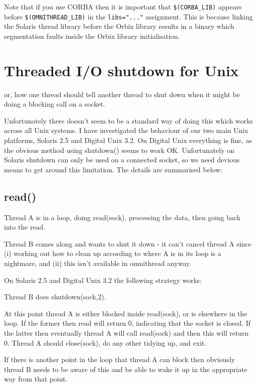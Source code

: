 \documentclass[11pt]{article}
\begin{document}
Note that if you use CORBA then it is important that {\tt \$(CORBA\_LIB)}
appears before {\tt \$(OMNITHREAD\_LIB)} in the {\tt libs="..."} assignment.
This is because linking the Solaris thread library before the Orbix library
results in a binary which segmentation faults inside the Orbix library
initialisation.



\section{Threaded I/O shutdown for Unix}

or, how one thread should tell another thread to shut down when it might
be doing a blocking call on a socket.

Unfortunately there doesn't seem to be a standard way of doing this which works
across all Unix systems.  I have investigated the behaviour of our two main
Unix platforms, Solaris 2.5 and Digital Unix 3.2.  On Digital Unix everything
is fine, as the obvious method using shutdown() seems to work OK.
Unfortunately on Solaris shutdown can only be used on a connected socket, so we
need devious means to get around this limitation.  The details are summarised
below:


\subsection{read()}

Thread A is in a loop, doing read(sock), processing the data, then going back
into the read.

Thread B comes along and wants to shut it down - it can't cancel thread A since
(i) working out how to clean up according to where A is in its loop is a
nightmare, and (ii) this isn't available in omnithread anyway.

On Solaris 2.5 and Digital Unix 3.2 the following strategy works:

Thread B does shutdown(sock,2).

At this point thread A is either blocked inside read(sock), or is elsewhere in
the loop.  If the former then read will return 0, indicating that the socket is
closed.  If the latter then eventually thread A will call read(sock) and then
this will return 0.  Thread A should close(sock), do any other tidying up, and
exit.

If there is another point in the loop that thread A can block then obviously
thread B needs to be aware of this and be able to wake it up in the appropriate
way from that point.
\end{document}
